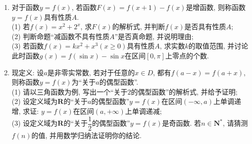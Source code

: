 \documentclass[10pt,a4paper]{article}
\begin{document}
\begin{enumerate}[1.]
$\Delta (f(x))=\dfrac 1n[(f(a_1)-b_1)^2+(f(a_2)-b_2)^2+\cdots +(f(a_n)-b_n)^2]$.\\
已知在平面直角坐标系上, 有$5$个点的坐标数据如下表所示:
\begin{center}
\begin{tabular}{|c|c|c|c|c|c|}
\hline
$x$  & $1$  & $2$  & $3$  & $4$  & $5$ \\ \hline
$y$  & $2.2$  & $1$  & $2$  & $4.6$  & $7$ \\ \hline
\end{tabular}
\end{center}
(1)若用函数$f_1(x)=x^2-4x+5$来拟合上述表格中的数据, 求$\Delta (f_1(x))$;\\
(2)若用函数$f_2(x)=2^{|x-2|}+m$来拟合上述表格中的数据.\\
\textcircled{1} 求该函数的拟合误差$\Delta (f_2(x))$的最小值, 并求出此时的函数解析式$y=f_2(x)$;\\
\textcircled{2} 指出用$f_1(x),f_2(x)$(指\textcircled{1}中使$\Delta(f_2(x))$最小的函数)中的哪一个函数来拟合上述表格中的数据更好?
\item 对于函数$y=f(x)$, 若函数$F(x)=f(x+1)-f(x)$是增函数, 则称函数$y=f(x)$具有性质$A$.\\
(1) 若$f(x)=x^2+2^x$, 求$F(x)$的解析式, 并判断$f(x)$是否具有性质$A$;\\
(2) 判断命题``减函数不具有性质$A$''是否真命题, 并说明理由;\\
(3) 若函数$f(x)=kx^2+x^3(x\ge 0)$具有性质$A$, 求实数$k$的取值范围, 并讨论此时函数$g(x)=f(\sin x)-\sin x$在区间$[0,\pi]$上零点的个数.
\item 现定义: 设$a$是非零实常数, 若对于任意的$x\in D$, 都有$f(a-x)=f(a+x)$, 则称函数$y=f(x)$为``关于$a$的偶型函数''.\\
(1) 请以三角函数为例, 写出一个``关于$2$的偶型函数''的解析式, 并给予证明;\\
(2) 设定义域为$\mathbf{R}$的``关于$a$的偶型函数''$y=f(x)$在区间$(-\infty ,a)$上单调递增, 求证: $y=f(x)$在区间$(a,+\infty)$上单调递减;\\
(3) 设定义域为$\mathbf{R}$的``关于$\dfrac 12$的偶型函数''$y=f(x)$是奇函数. 若$n\in \mathbf{N}^*$, 请猜测$f(n)$的值, 并用数学归纳法证明你的结论.


\end{enumerate}
\end{document}
